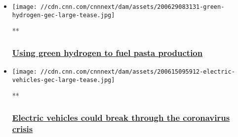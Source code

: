 \begin{itemize}
\item
  \href{/videos/business/2020/06/29/green-hydrogen-energy-gec.cnn-business}{}

  \texttt{[image: //cdn.cnn.com/cnnnext/dam/assets/200629083131-green-hydrogen-gec-large-tease.jpg]}

  **

  \hypertarget{using-green-hydrogen-to-fuel-pasta-production}{%
  \subsubsection{\texorpdfstring{\href{/videos/business/2020/06/29/green-hydrogen-energy-gec.cnn-business}{Using
  green hydrogen to fuel pasta
  production}}{Using green hydrogen to fuel pasta production}}\label{using-green-hydrogen-to-fuel-pasta-production}}
\item
  \href{/videos/business/2020/06/15/electric-vehicles-auto-industry-coronavirus-gec.cnn-business}{}

  \texttt{[image: //cdn.cnn.com/cnnnext/dam/assets/200615095912-electric-vehicles-gec-large-tease.jpg]}

  **

  \hypertarget{electric-vehicles-could-break-through-the-coronavirus-crisis}{%
  \subsubsection{\texorpdfstring{\href{/videos/business/2020/06/15/electric-vehicles-auto-industry-coronavirus-gec.cnn-business}{Electric
  vehicles could break through the coronavirus
  crisis}}{Electric vehicles could break through the coronavirus crisis}}\label{electric-vehicles-could-break-through-the-coronavirus-crisis}}
\end{itemize}

